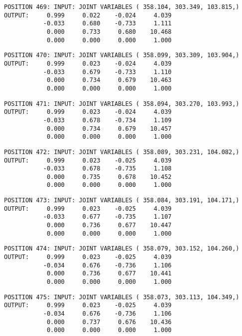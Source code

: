 \begin{verbatim}
POSITION 469: INPUT: JOINT VARIABLES ( 358.104, 303.349, 103.815,)
OUTPUT:     0.999     0.022    -0.024     4.039
           -0.033     0.680    -0.733     1.111
            0.000     0.733     0.680    10.468
            0.000     0.000     0.000     1.000
\end{verbatim} \pagebreak[1]\begin{verbatim}
POSITION 470: INPUT: JOINT VARIABLES ( 358.099, 303.309, 103.904,)
OUTPUT:     0.999     0.023    -0.024     4.039
           -0.033     0.679    -0.733     1.110
            0.000     0.734     0.679    10.463
            0.000     0.000     0.000     1.000
\end{verbatim} \pagebreak[1]\begin{verbatim}
POSITION 471: INPUT: JOINT VARIABLES ( 358.094, 303.270, 103.993,)
OUTPUT:     0.999     0.023    -0.024     4.039
           -0.033     0.678    -0.734     1.109
            0.000     0.734     0.679    10.457
            0.000     0.000     0.000     1.000
\end{verbatim} \pagebreak[1]\begin{verbatim}
POSITION 472: INPUT: JOINT VARIABLES ( 358.089, 303.231, 104.082,)
OUTPUT:     0.999     0.023    -0.025     4.039
           -0.033     0.678    -0.735     1.108
            0.000     0.735     0.678    10.452
            0.000     0.000     0.000     1.000
\end{verbatim} \pagebreak[1]\begin{verbatim}
POSITION 473: INPUT: JOINT VARIABLES ( 358.084, 303.191, 104.171,)
OUTPUT:     0.999     0.023    -0.025     4.039
           -0.033     0.677    -0.735     1.107
            0.000     0.736     0.677    10.447
            0.000     0.000     0.000     1.000
\end{verbatim} \pagebreak[1]\begin{verbatim}
POSITION 474: INPUT: JOINT VARIABLES ( 358.079, 303.152, 104.260,)
OUTPUT:     0.999     0.023    -0.025     4.039
           -0.034     0.676    -0.736     1.106
            0.000     0.736     0.677    10.441
            0.000     0.000     0.000     1.000
\end{verbatim} \pagebreak[1]\begin{verbatim}
POSITION 475: INPUT: JOINT VARIABLES ( 358.073, 303.113, 104.349,)
OUTPUT:     0.999     0.023    -0.025     4.039
           -0.034     0.676    -0.736     1.106
            0.000     0.737     0.676    10.436
            0.000     0.000     0.000     1.000
\end{verbatim} \pagebreak[1]\begin{verbatim}

\end{verbatim}
